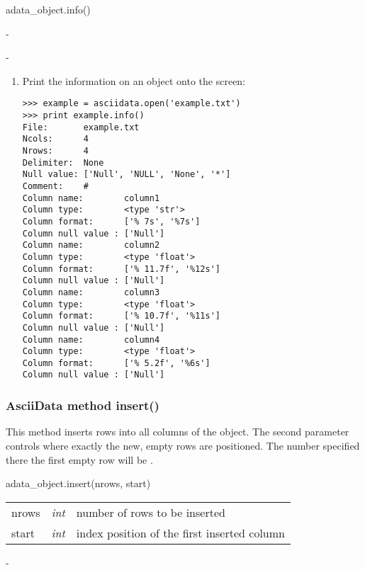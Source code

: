 adata\_object.info()

-

-

\begin{enumerate}
\item Print the information on an \ad object onto the screen:
\begin{small}
\begin{verbatim}
>>> example = asciidata.open('example.txt')
>>> print example.info()
File:       example.txt
Ncols:      4
Nrows:      4
Delimiter:  None
Null value: ['Null', 'NULL', 'None', '*']
Comment:    #
Column name:        column1
Column type:        <type 'str'>
Column format:      ['% 7s', '%7s']
Column null value : ['Null']
Column name:        column2
Column type:        <type 'float'>
Column format:      ['% 11.7f', '%12s']
Column null value : ['Null']
Column name:        column3
Column type:        <type 'float'>
Column format:      ['% 10.7f', '%11s']
Column null value : ['Null']
Column name:        column4
Column type:        <type 'float'>
Column format:      ['% 5.2f', '%6s']
Column null value : ['Null']
\end{verbatim}
\end{small}
\end{enumerate}

\subsubsection{AsciiData method insert()}
\label{adm_insert}
This method inserts rows into all columns of the \ad object.
The second parameter controls where exactly the new, empty rows
are positioned. The number specified there the first empty
row will be .

adata\_object.insert(nrows, start)

\begin{tabular}{lcl}
nrows &{\it int}& number of rows to be inserted\\
start &{\it int}& index position of the first inserted column\\
\end{tabular}

-

